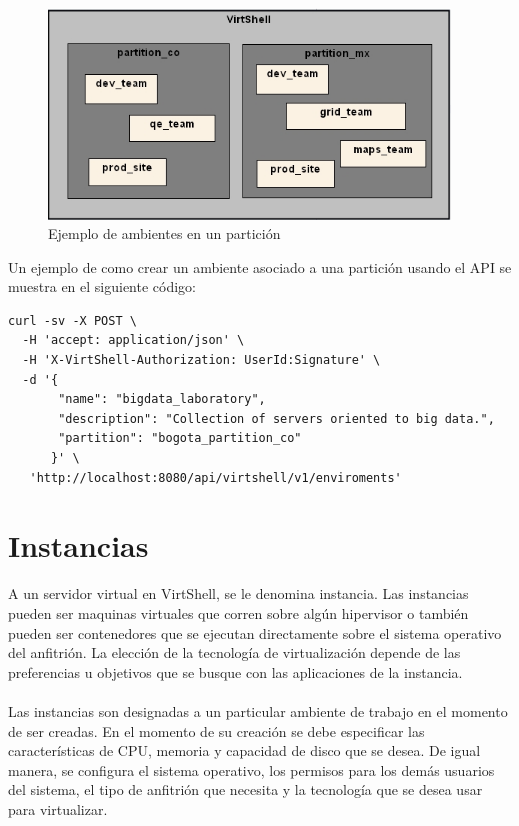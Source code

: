 \begin{figure}[h]
    \centering
	\caption{Ejemplo de ambientes en un partición}
	\label{fig:enviroment}
	\includegraphics[width = 0.95\textwidth]{../architecture/v1/diagrams/enviroments}
\end{figure}

Un ejemplo de como crear un ambiente asociado a una partición usando el API se muestra en el siguiente código:

\begin{lstlisting}[style=json, caption=Petición HTTP para crear un ambiente]
curl -sv -X POST \
  -H 'accept: application/json' \
  -H 'X-VirtShell-Authorization: UserId:Signature' \
  -d '{
       "name": "bigdata_laboratory",
       "description": "Collection of servers oriented to big data.", 
       "partition": "bogota_partition_co"
      }' \
   'http://localhost:8080/api/virtshell/v1/enviroments'
\end{lstlisting}

\section{Instancias}
A un servidor virtual en VirtShell, se le denomina instancia. Las instancias pueden ser maquinas virtuales que corren sobre algún hipervisor o también pueden ser contenedores que se ejecutan directamente sobre el sistema operativo del anfitrión. La elección de la tecnología de virtualización depende de las preferencias u objetivos que se busque con las aplicaciones de la instancia.\\
\\
Las instancias son designadas a un particular ambiente de trabajo en el momento de ser creadas. En el momento de su creación se debe especificar las características de CPU, memoria y capacidad de disco que se desea. De igual manera, se configura el sistema operativo, los permisos para los demás usuarios del sistema, el tipo de anfitrión que necesita y la tecnología que se desea usar para virtualizar.\\ 
\\
